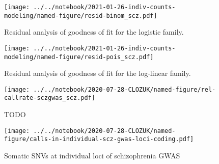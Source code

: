 \documentclass[letterpaper]{article}
\begin{document}
\begin{figure}[p]
\texttt{[image: ../../notebook/2021-01-26-indiv-counts-modeling/named-figure/resid-binom\_scz.pdf]}
\caption{
Residual analysis of goodness of fit for the logistic family.
}
\label{fig:binomial-QQ}
\end{figure}

\begin{figure}[p]
\texttt{[image: ../../notebook/2021-01-26-indiv-counts-modeling/named-figure/resid-pois\_scz.pdf]}
\caption{
Residual analysis of goodness of fit for the log-linear family.
}
\label{fig:poisson-QQ}
\end{figure}

\begin{figure}[p]
\texttt{[image: ../../notebook/2020-07-28-CLOZUK/named-figure/rel-callrate-sczgwas\_scz.pdf]}
\caption{
TODO
}
\label{fig:scz-gwas-genes-vs-loci}
\end{figure}

\begin{figure}[p]
\texttt{[image: ../../notebook/2020-07-28-CLOZUK/named-figure/calls-in-individual-scz-gwas-loci-coding.pdf]}
\caption{
Somatic SNVs at individual loci of schizophrenia GWAS
}
\label{fig:indiv-scz-gwas-loci}
\end{figure}
\end{document}
